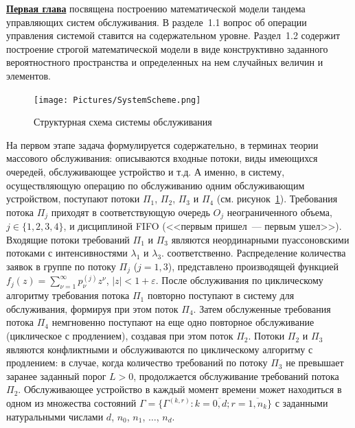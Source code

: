  \underline{\textbf{Первая глава}} посвящена построению математической модели тандема управляющих систем обслуживания. В разделе~1.1 вопрос об операции управления системой ставится на содержательном уровне. Раздел~1.2 содержит построение строгой математической модели в виде конструктивно заданного вероятностного пространства и определенных на нем случайных величин и элементов.
 
 \begin{figure}[h]
\texttt{[image: Pictures/SystemScheme.png]} 
\caption{Структурная схема системы обслуживания}
\label{SystemScheme}
\end{figure}

 На первом этапе задача формулируется содержательно, в терминах теории массового обслуживания: описываются входные потоки, виды имеющихся очередей,  обслуживающее устройство и т.д. А именно, в систему,  осуществляющую операцию по обслуживанию одним обслуживающим устройством, поступают потоки $\Pi_1$,  $\Pi_2$,  $\Pi_3$  и $\Pi_4$ (см. рисунок~\ref{SystemScheme}). Требования потока $\Pi_j$ приходят в соответствующую очередь $O_j$ неограниченного объема,  $j\in \{1,  2,  3,  4\}$, и дисциплиной FIFO (<<первым пришел~--- первым ушел>>).
Входящие потоки требований $\Pi_1$ и $\Pi_3$ являются неординарными пуассоновскими потоками с интенсивностями $\lambda_1$ и $\lambda_3$. соответственно. Распределение количества заявок в группе по потоку $\Pi_j$ ($j=1,3$), представлено производящей функцией 
$f_j(z) = \sum_{\nu=1}^{\infty} p_{\nu}^{(j)} z^{\nu}$, $|z|<1+\varepsilon$. После обслуживания по циклическому алгоритму требования потока $\Pi_1$ повторно поступают в систему для обслуживания,  формируя при этом поток $\Pi_4$. Затем обслуженные требования потока $\Pi_4$ немгновенно поступают на еще одно повторное обслуживание (циклическое с продлением), создавая при этом поток $\Pi_2$. Потоки $\Pi_2$ и $\Pi_3$ являются конфликтными и обслуживаются по циклическому алгоритму с продлением: в случае, когда количество требований по потоку $\Pi_3$ не превышает заранее заданный порог $L>0$, продолжается обслуживание требований потока $\Pi_2$. Обслуживающее устройство в каждый момент времени может находиться в одном из множества состояний $\Gamma=\{\Gamma^{(k, r)} \colon k=\overline{0, d}; r=\overline{1, n_k}\}$ с заданными натуральными числами $d$,  $n_0$,  $n_1$,  $\ldots$,  $n_d$. 

